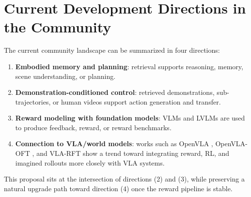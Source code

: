 \section{Current Development Directions in the Community}

The current community landscape can be summarized in four directions:
\begin{enumerate}
  \item \textbf{Embodied memory and planning}: retrieval supports reasoning, memory, scene understanding, or planning.
  \item \textbf{Demonstration-conditioned control}: retrieved demonstrations, sub-trajectories, or human videos support action generation and transfer.
  \item \textbf{Reward modeling with foundation models}: VLMs and LVLMs are used to produce feedback, reward, or reward benchmarks.
  \item \textbf{Connection to VLA/world models}: works such as OpenVLA \citep{kim2024openvla}, OpenVLA-OFT \citep{wang2025openvlaoft}, and VLA-RFT \citep{li2025vlarft} show a trend toward integrating reward, RL, and imagined rollouts more closely with VLA systems.
\end{enumerate}

This proposal sits at the intersection of directions (2) and (3),
while preserving a natural upgrade path toward direction (4) once the reward pipeline is stable.
